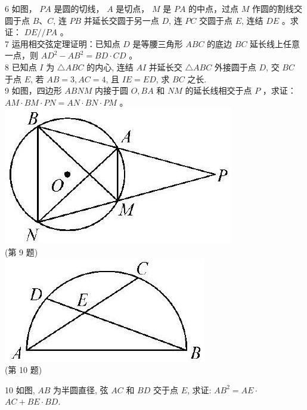 \documentclass[10pt]{article}
\begin{document}
6 如图， $P A$ 是圆的切线， $A$ 是切点， $M$ 是 $P A$ 的中点，过点 $M$ 作圆的割线交圆于点 $B 、 C$, 连 $P B$ 并延长交圆于另一点 $D$, 连 $P C$ 交圆于点 $E$, 连结 $D E$ 。求证： $D E / / P A$ 。\\
7 运用相交弦定理证明：已知点 $D$ 是等腰三角形 $A B C$ 的底边 $B C$ 延长线上任意一点，则 $A D^{2}-A B^{2}=B D \cdot C D$ 。\\
8 已知点 $I$ 为 $\triangle A B C$ 的内心, 连结 $A I$ 并延长交 $\triangle A B C$ 外接圆于点 $D$, 交 $B C$ 于点 $E$, 若 $A B=3, A C=4$, 且 $I E=E D$, 求 $B C$ 之长.\\
9 如图，四边形 $A B N M$ 内接于圆 $O, B A$ 和 $N M$ 的延长线相交于点 $P$ ，求证： $A M \cdot B M \cdot P N=A N \cdot B N \cdot P M$ 。\\
\includegraphics[max width=\textwidth, center]{2024_10_30_66b8e5e701da2093c133g-057(1)}\\
(第 9 题)\\
\includegraphics[max width=\textwidth, center]{2024_10_30_66b8e5e701da2093c133g-057}\\
(第 10 题)

10 如图, $A B$ 为半圆直径, 弦 $A C$ 和 $B D$ 交于点 $E$, 求证: $A B^{2}=A E \cdot$ $A C+B E \cdot B D$.
\end{document}
